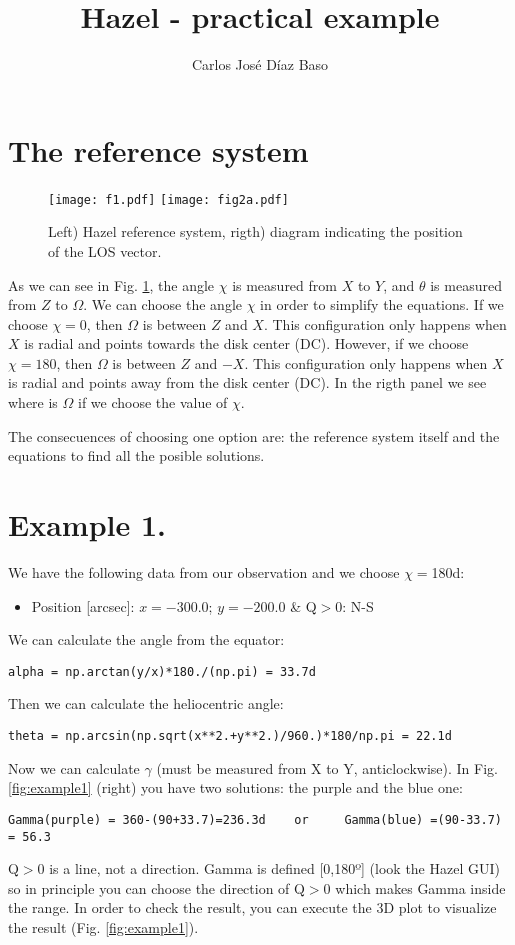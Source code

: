\documentclass[11pt,a4paper]{article}
\begin{document}
\title{Hazel - practical example}
\author{Carlos José Díaz Baso}
\maketitle

\section{The reference system}


\begin{figure}[ht!]
\centering
\texttt{[image: f1.pdf]}
\texttt{[image: fig2a.pdf]}
\caption{Left) Hazel reference system, rigth) diagram indicating the position of the LOS vector.}
\label{fig:figure1}
\end{figure}


As we can see in Fig. \ref{fig:figure1}, the angle $\chi$ is measured from $X$ to $Y$, and $\theta$ is measured from $Z$ to $\Omega$. We can choose the angle $\chi$ in order to simplify the equations. If we choose $\chi= 0$, then $\Omega$ is between $Z$ and $X$. This configuration only happens when $X$ is radial and  points towards the disk center (DC). However, if we choose $\chi= 180$, then $\Omega$ is between $Z$ and $-X$. This configuration only happens when $X$ is radial and  points away from the disk center (DC). In the rigth panel we see where is $\Omega$ if we choose the value of $\chi$. 

The consecuences of choosing one option are: the reference system itself and the equations to find all the posible solutions.

\clearpage
\section{Example 1.}
We have the following data from our observation and we choose $\chi=$180d:
\begin{itemize}
\item Position [arcsec]: $x=-300.0$; $y=-200.0$ \& Q$>$0: N-S
\end{itemize}

We can calculate the angle from the equator:
\begin{lstlisting}
alpha = np.arctan(y/x)*180./(np.pi) = 33.7d
\end{lstlisting}
Then we can calculate the heliocentric angle:
\begin{lstlisting}
theta = np.arcsin(np.sqrt(x**2.+y**2.)/960.)*180/np.pi = 22.1d
\end{lstlisting}
Now we can calculate $\gamma$ (must be measured from X to Y, anticlockwise). In Fig. \ref{fig:example1} (right) you have two solutions: the purple and the blue one:
\begin{lstlisting}
Gamma(purple) = 360-(90+33.7)=236.3d    or     Gamma(blue) =(90-33.7) = 56.3
\end{lstlisting}
Q$>$0 is a line, not  a direction. Gamma is defined [0,180º] (look the Hazel GUI) so in principle you can choose the direction of Q$>$0 which makes Gamma  inside the range. In order to check the result, you can execute the 3D plot to visualize the result (Fig. \ref{fig:example1}).
\end{document}
